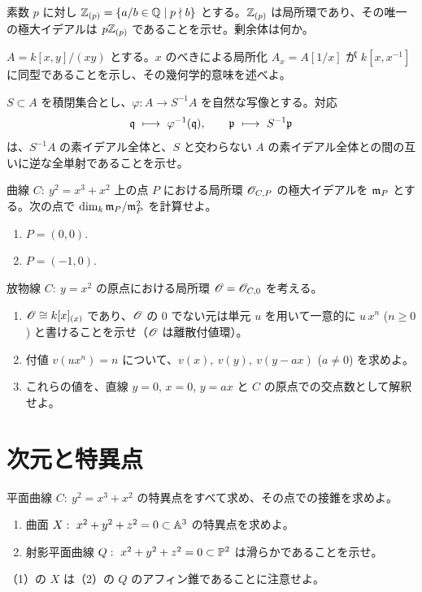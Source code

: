 素数 $p$ に対し $\mathbb{Z}_{(p)}=\{a/b\in\mathbb{Q}\mid p\nmid b\}$ とする。$\mathbb{Z}_{(p)}$ は局所環であり、その唯一の極大イデアルは $p\mathbb{Z}_{(p)}$ であることを示せ。剰余体は何か。

$A=k[x,y]/(xy)$ とする。$x$ のべきによる局所化 $A_x=A[1/x]$ が $k[x,x^{-1}]$ に同型であることを示し、その幾何学的意味を述べよ。

$S\subset A$ を積閉集合とし、$\varphi:A\to S^{-1}A$ を自然な写像とする。対応
\[
  \q\ \longmapsto\ \varphi^{-1}(\q),\qquad \p\ \longmapsto\ S^{-1}\p
\]
は、$S^{-1}A$ の素イデアル全体と、$S$ と交わらない $A$ の素イデアル全体との間の互いに逆な全単射であることを示せ。

曲線 $C:\ y^2=x^3+x^2$ 上の点 $P$ における局所環 $\mathscr{O}_{C,P}$ の極大イデアルを $\mathfrak{m}_P$ とする。次の点で $\dim_k\mathfrak{m}_P/\mathfrak{m}_P^2$ を計算せよ。
\begin{enumerate}
  \item $P=(0,0)$.
  \item $P=(-1,0)$.
\end{enumerate}

放物線 $C:\ y=x^2$ の原点における局所環 $\mathscr{O}=\mathscr{O}_{C,0}$ を考える。
\begin{enumerate}
  \item $\mathscr{O}\cong k[x]_{(x)}$ であり、$\mathscr{O}$ の $0$ でない元は単元 $u$ を用いて一意的に $u\,x^n$ ($n\geq 0$) と書けることを示せ（$\mathscr{O}$ は離散付値環）。
  \item 付値 $v(u x^n)=n$ について、$v(x),\ v(y),\ v(y-ax)$ ($a\neq 0$) を求めよ。
  \item これらの値を、直線 $y=0$, $x=0$, $y=ax$ と $C$ の原点での交点数として解釈せよ。
\end{enumerate}

\section{次元と特異点}

平面曲線 $C:\ y^2=x^3+x^2$ の特異点をすべて求め、その点での接錐を求めよ。

\begin{enumerate}
  \item 曲面 $X:\ x^2+y^2+z^2=0\subset\A^3$ の特異点を求めよ。
  \item 射影平面曲線 $Q:\ x^2+y^2+z^2=0\subset\PP^2$ は滑らかであることを示せ。
\end{enumerate}
（1）の $X$ は（2）の $Q$ のアフィン錐であることに注意せよ。

